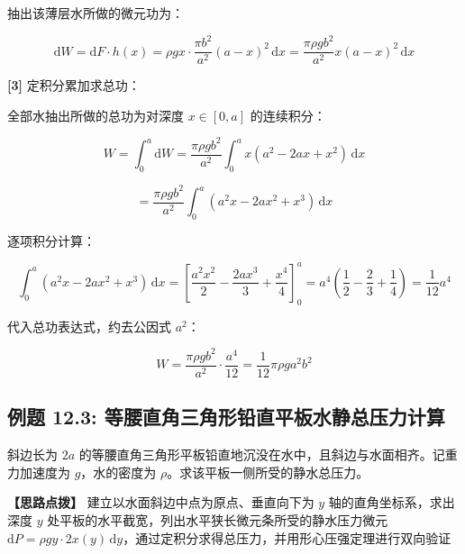 \documentclass[11pt,a4paper,UTF8]{ctexart}
\begin{document}
\begin{solbox}[分步推导与答题规范]
抽出该薄层水所做的微元功为：


\begin{equation*}
\mathrm{d}W = \mathrm{d}F \cdot h(x) = \rho g x \cdot \frac{\pi b^2}{a^2}(a - x)^2\,\mathrm{d}x = \frac{\pi \rho g b^2}{a^2} x(a - x)^2\,\mathrm{d}x
\end{equation*}


\textbf{[3]} 定积分累加求总功：

全部水抽出所做的总功为对深度 $x \in [0, a]$ 的连续积分：


\begin{equation*}
W = \int_0^a \mathrm{d}W = \frac{\pi \rho g b^2}{a^2} \int_0^a x(a^2 - 2ax + x^2)\,\mathrm{d}x
\end{equation*}



\begin{equation*}
= \frac{\pi \rho g b^2}{a^2} \int_0^a (a^2 x - 2a x^2 + x^3)\,\mathrm{d}x
\end{equation*}


逐项积分计算：


\begin{equation*}
\int_0^a (a^2 x - 2a x^2 + x^3)\,\mathrm{d}x = \left[\frac{a^2 x^2}{2} - \frac{2a x^3}{3} + \frac{x^4}{4}\right]_0^a = a^4 \left(\frac{1}{2} - \frac{2}{3} + \frac{1}{4}\right) = \frac{1}{12}a^4
\end{equation*}


代入总功表达式，约去公因式 $a^2$：


\begin{equation*}
W = \frac{\pi \rho g b^2}{a^2} \cdot \frac{a^4}{12} = \frac{1}{12}\pi \rho g a^2 b^2
\end{equation*}

\end{solbox}


\subsection{例题 12.3: 等腰直角三角形铅直平板水静总压力计算}

斜边长为 $2a$ 的等腰直角三角形平板铅直地沉没在水中，且斜边与水面相齐。记重力加速度为 $g$，水的密度为 $\rho$。求该平板一侧所受的静水总压力。

\textbf{\color{DeepPurple}【思路点拨】} 建立以水面斜边中点为原点、垂直向下为 $y$ 轴的直角坐标系，求出深度 $y$ 处平板的水平截宽，列出水平狭长微元条所受的静水压力微元 $\mathrm{d}P = \rho g y \cdot 2x(y)\,\mathrm{d}y$，通过定积分求得总压力，并用形心压强定理进行双向验证
\end{document}
